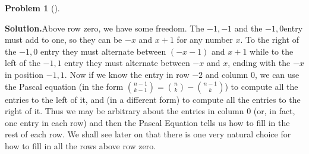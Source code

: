 \documentclass[10pt,]{book}
\theoremstyle{plain}
\theoremstyle{definition}
\newtheorem{activity}[project]{Problem}
\theoremstyle{definition}
\numberwithin{equation}{chapter}
\begin{document}
\begin{activity}[]
\begin{enumerate}[font=\bfseries,label=(\alph*),ref=\alph*]
\textbf{Solution.}\quad Above row zero, we have some freedom. The \(-1,-1\) and the \(-1,0 \)entry must add to one, so they can be \(-x\) and \(x+1\) for any number \(x\). To the right of the \(-1,0\) entry they must alternate between \((-x-1)\) and \(x+1\) while to the left of the \(-1,1\) entry they must alternate between \(-x\) and \(x\), ending with the \(-x\) in position \(-1,1\). Now if we know the entry in row \(-2\) and column 0, we can use the Pascal equation (in the form \(\binom{n-1}{k-1} = \binom{n}{k} - \binom{n-1}{k}\)) to compute all the entries to the left of it, and (in a different form) to compute all the entries to the right of it. Thus we may be arbitrary about the entries in column 0 (or, in fact, one entry in each row) and then the Pascal Equation tells us how to fill in the rest of each row. We shall see later on that there is one very natural choice for how to fill in all the rows above row zero.%
\end{enumerate}
\end{activity}
\end{document}
